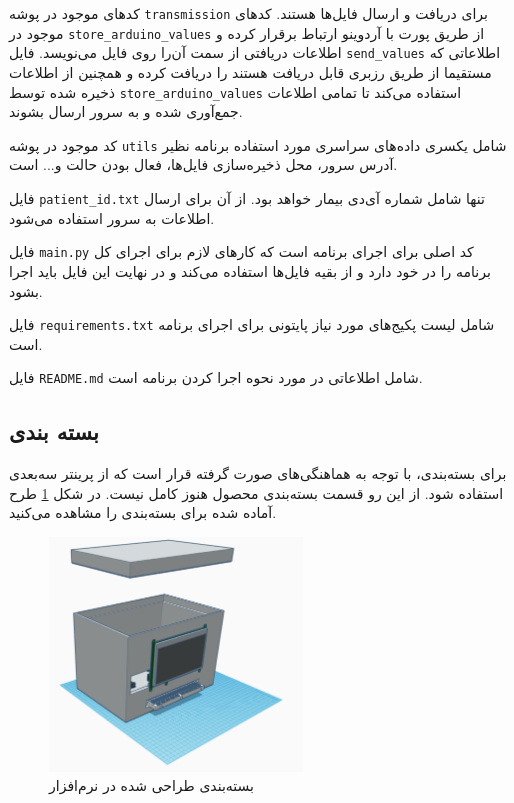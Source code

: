 کدهای موجود در پوشه \verb+transmission+ برای دریافت و ارسال فایل‌ها هستند. کدهای موجود در \verb+store_arduino_values+ از طریق پورت  با آردوینو ارتباط برقرار کرده و اطلاعات دریافتی از سمت‌ آن‌را روی فایل می‌نویسد. فایل \verb+send_values+ اطلاعاتی که مستقیما از طریق رزبری قابل دریافت هستند را دریافت کرده و همچنین از اطلاعات ذخیره شده توسط \verb+store_arduino_values+ استفاده می‌کند تا تمامی اطلاعات جمع‌آوری شده و به سرور ارسال بشوند.

کد موجود در پوشه \verb+utils+ شامل یکسری داده‌های سراسری مورد استفاده برنامه نظیر آدرس سرور، محل ذخیره‌سازی فایل‌ها، فعال بودن حالت  و... است.

فایل \verb+patient_id.txt+ تنها شامل شماره آی‌دی بیمار خواهد بود. از آن برای ارسال اطلاعات به سرور استفاده می‌شود.

فایل \verb+main.py+ کد اصلی برای اجرای برنامه است که کارهای لازم برای اجرای کل برنامه را در خود دارد و از بقیه فایل‌ها استفاده می‌کند و در نهایت این فایل باید اجرا بشود.
 
فایل \verb+requirements.txt+ شامل لیست پکیج‌های مورد نیاز پایتونی برای اجرای برنامه است.

فایل \verb+README.md+ شامل اطلاعاتی در مورد نحوه اجرا کردن برنامه است.




\subsection{بسته بندی}

برای بسته‌بندی، با توجه به هماهنگی‌های صورت گرفته قرار است که از پرینتر سه‌بعدی استفاده شود. از این رو قسمت بسته‌بندی محصول هنوز کامل نیست. در شکل \ref{fig:9} طرح آماده شده برای بسته‌بندی را مشاهده می‌کنید.

\begin{figure}[h]
	\centering
	\includegraphics[width=0.6\textwidth]{figs/package.png}
	
	\caption{بسته‌بندی طراحی شده در نرم‌افزار }
	\label{fig:9}
\end{figure}

